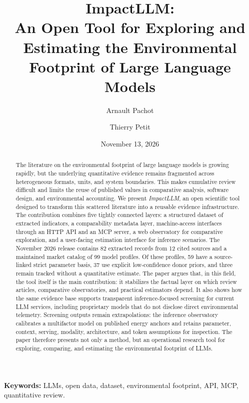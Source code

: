 \documentclass[11pt,a4paper]{article}
\title{ImpactLLM:\\An Open Tool for Exploring and Estimating the Environmental Footprint of Large Language Models}
\author{Arnault Pachot \and Thierry Petit}
\date{November 13, 2026}
\begin{document}
\maketitle

\begin{abstract}
The literature on the environmental footprint of large language models is growing rapidly, but the underlying quantitative evidence remains fragmented across heterogeneous formats, units, and system boundaries. This makes cumulative review difficult and limits the reuse of published values in comparative analysis, software design, and environmental accounting. We present \emph{ImpactLLM}, an open scientific tool designed to transform this scattered literature into a reusable evidence infrastructure. The contribution combines five tightly connected layers: a structured dataset of extracted indicators, a comparability metadata layer, machine-access interfaces through an HTTP API and an MCP server, a web observatory for comparative exploration, and a user-facing estimation interface for inference scenarios. The November 2026 release contains 82 extracted records from 12 cited sources and a maintained market catalog of 99 model profiles. Of these profiles, 59 have a source-linked strict parameter basis, 37 use explicit low-confidence donor priors, and three remain tracked without a quantitative estimate. The paper argues that, in this field, the tool itself is the main contribution: it stabilizes the factual layer on which review articles, comparative observatories, and practical estimators depend. It also shows how the same evidence base supports transparent inference-focused screening for current LLM services, including proprietary models that do not disclose direct environmental telemetry. Screening outputs remain extrapolations: the inference observatory calibrates a multifactor model on published energy anchors and retains parameter, context, serving, modality, architecture, and token assumptions for inspection. The paper therefore presents not only a method, but an operational research tool for exploring, comparing, and estimating the environmental footprint of LLMs.
\end{abstract}

\textbf{Keywords:} LLMs, open data, dataset, environmental footprint, API, MCP, quantitative review.
\end{document}
